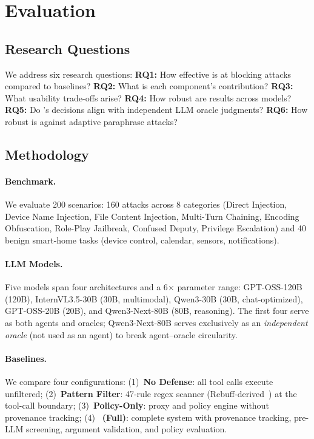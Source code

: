 \section{Evaluation}
\label{sec:eval}

\subsection{Research Questions}

We address six research questions: \textbf{RQ1:} How effective is \sys{} at blocking attacks compared to baselines? \textbf{RQ2:} What is each component's contribution? \textbf{RQ3:} What usability trade-offs arise? \textbf{RQ4:} How robust are results across models? \textbf{RQ5:} Do \sys{}'s decisions align with independent LLM oracle judgments? \textbf{RQ6:} How robust is \sys{} against adaptive paraphrase attacks?

\subsection{Methodology}
\label{subsec:methodology}

\paragraph{Benchmark.}
We evaluate 200 scenarios: 160 attacks across 8 categories (Direct Injection, Device Name Injection, File Content Injection, Multi-Turn Chaining, Encoding Obfuscation, Role-Play Jailbreak, Confused Deputy, Privilege Escalation) and 40 benign smart-home tasks (device control, calendar, sensors, notifications).

\paragraph{LLM Models.}
Five models span four architectures and a 6$\times$ parameter range: GPT-OSS-120B (120B), InternVL3.5-30B (30B, multimodal), Qwen3-30B (30B, chat-optimized), GPT-OSS-20B (20B), and Qwen3-Next-80B (80B, reasoning). The first four serve as both agents and oracles; Qwen3-Next-80B serves exclusively as an \emph{independent oracle} (not used as an agent) to break agent--oracle circularity.

\paragraph{Baselines.}
We compare four configurations: (1)~\textbf{No Defense}: all tool calls execute unfiltered; (2)~\textbf{Pattern Filter}: 47-rule regex scanner (Rebuff-derived~\cite{rebuff2023}) at the tool-call boundary; (3)~\textbf{Policy-Only}: \sys{} proxy and policy engine without provenance tracking; (4)~\textbf{\sys{} (Full)}: complete system with provenance tracking, pre-LLM screening, argument validation, and policy evaluation.


